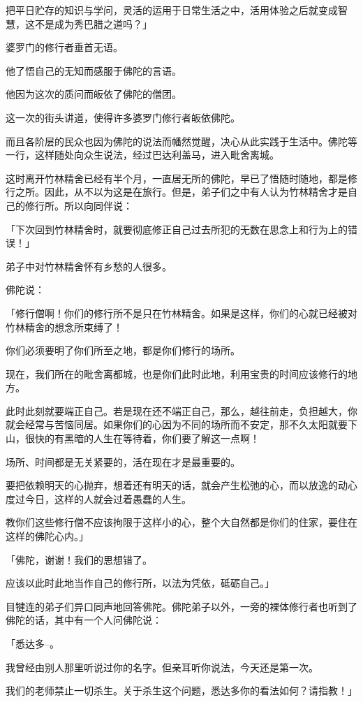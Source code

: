\documentclass[twoside,openany]{book}
\begin{document}
把平日贮存的知识与学问，灵活的运用于日常生活之中，活用体验之后就变成智慧，这不是成为秀巴腊之道吗？」

婆罗门的修行者垂首无语。

他了悟自己的无知而感服于佛陀的言语。

他因为这次的质问而皈依了佛陀的僧团。

这一次的街头讲道，使得许多婆罗门修行者皈依佛陀。

而且各阶层的民众也因为佛陀的说法而幡然觉醒，决心从此实践于生活中。佛陀等一行，这样随处向众生说法，经过巴达利盖马，进入毗舍离城。

这时离开竹林精舍已经有半个月，一直居无所的佛陀，早已了悟随时随地，都是修行之所。因此，从不以为这是在旅行。但是，弟子们之中有人认为竹林精舍才是自己的修行所。所以向同伴说：

「下次回到竹林精舍时，就要彻底修正自己过去所犯的无数在思念上和行为上的错误！」

弟子中对竹林精舍怀有乡愁的人很多。

佛陀说：

「修行僧啊！你们的修行所不是只在竹林精舍。如果是这样，你们的心就已经被对竹林精舍的想念所束缚了！

你们必须要明了你们所至之地，都是你们修行的场所。

现在，我们所在的毗舍离都城，也是你们此时此地，利用宝贵的时间应该修行的地方。

此时此刻就要端正自己。若是现在还不端正自己，那么，越往前走，负担越大，你就会经常与苦恼同居。如果你们的心因为不同的场所而不安定，那不久太阳就要下山，很快的有黑暗的人生在等待着，你们要了解这一点啊！

场所、时间都是无关紧要的，活在现在才是最重要的。

要把依赖明天的心抛弃，想着还有明天的话，就会产生松弛的心，而以放逸的动心度过今日，这样的人就会过着愚蠢的人生。

教你们这些修行僧不应该拘限于这样小的心，整个大自然都是你们的住家，要住在这样的佛陀心内。」

「佛陀，谢谢！我们的思想错了。

应该以此时此地当作自己的修行所，以法为凭依，砥砺自己。」

目犍连的弟子们异口同声地回答佛陀。佛陀弟子以外，一旁的裸体修行者也听到了佛陀的话，其中有一个人问佛陀说：

「悉达多--。		

我曾经由别人那里听说过你的名字。但亲耳听你说法，今天还是第一次。

我们的老师禁止一切杀生。关于杀生这个问题，悉达多你的看法如何？请指教！」
\end{document}
